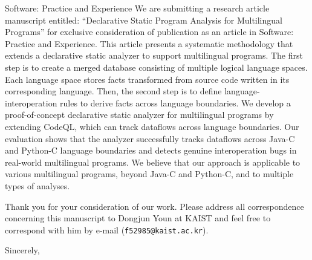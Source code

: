 \documentclass{letter}
\begin{document}
\begin{letter}{
Software: Practice and Experience
}
We are submitting a research article manuscript entitled: ``Declarative Static Program Analysis
for Multilingual Programs'' for exclusive consideration of publication as an
article in Software: Practice and Experience.
This article presents a systematic methodology that extends a declarative static
analyzer to support multilingual programs.  The first step is to create a
merged database consisting of multiple logical language spaces. Each language
space stores facts transformed from source code written in its corresponding
language.  Then, the second step is to define language-interoperation rules to
derive facts across language boundaries.  We develop a proof-of-concept
declarative static analyzer for multilingual programs by extending CodeQL,
which can track dataflows across language boundaries. Our evaluation shows that
the analyzer successfully tracks dataflows across Java-C and Python-C language
boundaries and detects genuine interoperation bugs in real-world multilingual
programs.  We believe that our approach is applicable to various multilingual
programs, beyond Java-C and Python-C, and to multiple types of analyses.

\medskip

Thank you for your consideration of our work.
Please address all correspondence concerning this manuscript to Dongjun Youn at KAIST and
feel free to correspond with him by e-mail ({\tt f52985@kaist.ac.kr}).

\closing{Sincerely,}
\end{letter}
\end{document}
